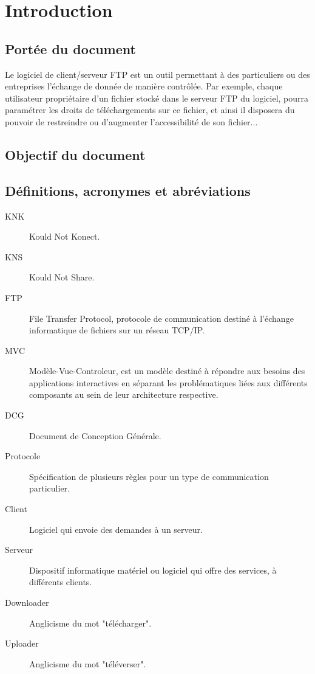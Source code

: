 \documentclass[10pt,a4paper]{report}
\begin{document}

\section{Introduction}


\subsection{Portée du document}
Le logiciel de client/serveur FTP est un outil permettant à des particuliers ou des entreprises l'échange de donnée de manière contrôlée. Par exemple, chaque utilisateur propriétaire d'un fichier stocké dans le serveur FTP du logiciel, pourra paramétrer les droits de téléchargements sur ce fichier, et ainsi il disposera du pouvoir de restreindre ou d'augmenter l'accessibilité de son fichier...

\subsection{Objectif du document}

\subsection{Définitions, acronymes et abréviations}
\begin{description}
\item[KNK] Kould Not Konect.
\item[KNS] Kould Not Share.
\item[FTP] File Transfer Protocol, protocole de communication destiné à l'échange informatique de fichiers sur un réseau TCP/IP.
\item [MVC] Modèle-Vue-Controleur, est un modèle destiné à répondre aux besoins des applications interactives en séparant les problématiques liées aux différents composants au sein de leur architecture respective.
\item[DCG] Document de Conception Générale.
\item[Protocole] Spécification de plusieurs règles pour un type de communication particulier.
\item[Client] Logiciel qui envoie des demandes à un serveur.
\item[Serveur] Dispositif informatique matériel ou logiciel qui offre des services, à différents clients.
\item[Downloader] Anglicisme du mot "télécharger".
\item[Uploader] Anglicisme du mot "téléverser".
\end{description}
\end{document}
